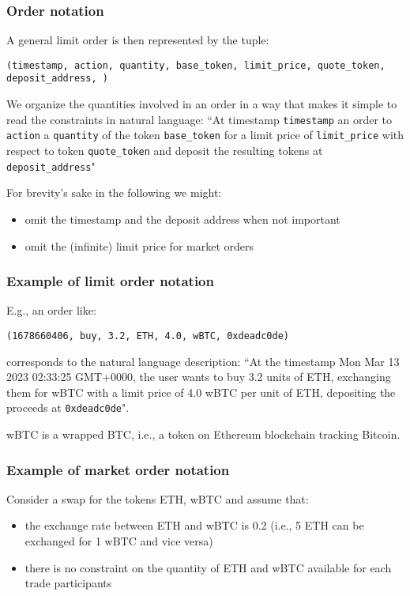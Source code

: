 \documentclass[11pt, reqno]{amsart}
\begin{document}
\subsubsection{Order notation}
A general limit order is then represented by the tuple:
\begin{center}
	\texttt{(timestamp, action, quantity, base\_token, limit\_price, quote\_token, 
     deposit\_address,  )}
\end{center}

We organize the quantities involved in an order in a way that makes it simple
to read the constraints in natural language: ``At timestamp \texttt{timestamp}
an order to \texttt{action} a \texttt{quantity} of the token
\texttt{base\_token} for a limit price of \texttt{limit\_price} with respect to
token \texttt{quote\_token} and deposit the resulting tokens at
\texttt{deposit\_address}"

For brevity's sake in the following we might:
\begin{itemize}
	\item omit the timestamp and the deposit address when not important
	\item omit the (infinite) limit price for market orders
\end{itemize}

\subsubsection{Example of limit order notation}
E.g., an order like:
\begin{center}
	\texttt{(1678660406, buy, 3.2, ETH, 4.0, wBTC, \texttt{0xdeadc0de})}
\end{center}
corresponds to the natural language description:
``At the timestamp Mon Mar 13 2023 02:33:25 GMT+0000, the user wants to buy 3.2
units of ETH, exchanging them for wBTC with a limit price of 4.0 wBTC per unit
of ETH, depositing the proceeds at \texttt{0xdeadc0de}".

wBTC is a wrapped BTC, i.e., a token on Ethereum blockchain tracking Bitcoin.

\subsubsection{Example of market order notation}
Consider a swap for the tokens ETH, wBTC and assume that:
\begin{itemize}
\item the exchange rate between ETH and wBTC is 0.2 (i.e., 5 ETH can be
  exchanged for 1 wBTC and vice versa)
\item there is no constraint on the quantity of ETH and wBTC available for each
  trade participants
\end{itemize}
\end{document}
